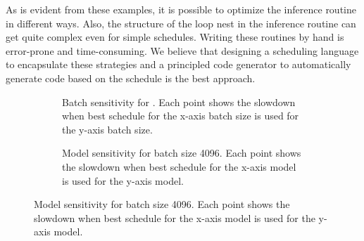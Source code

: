 As is evident from these examples, it is possible to optimize 
the inference routine in different ways. Also, the structure of the loop 
nest in the inference routine can get quite complex even 
for simple schedules. Writing these routines by hand 
is error-prone and time-consuming.  We believe that designing a 
scheduling language to encapsulate these strategies and a principled code 
generator to automatically generate code based on the schedule is the 
best approach. 

\begin{figure}[]
  \centering
  \begin{subfigure}[b]{.3\textwidth}
    \caption{\label{fig:sensitivitya} Batch sensitivity for . Each point shows the slowdown when best schedule for the 
    x-axis batch size is used for the y-axis batch size.}
  \end{subfigure}
  \begin{subfigure}[b]{.3\textwidth}
    \caption{\label{fig:sensitivityb} Model sensitivity for batch size 4096. Each point shows the slowdown when best schedule for the
    x-axis model is used for the y-axis model.}
  \end{subfigure}
\end{figure}

